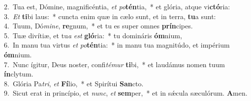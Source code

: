{2.~}Tua est, Dómine, magnificéntia, \textit{et} \textit{po}\textbf{tén}tia,~* et glória, atque vi\textbf{ctó}ria:\\
{3.~}\textit{Et} \textbf{ti}bi laus:~* cuncta enim quæ in cælo sunt, et in terra, \textbf{tu}a sunt:\\
{4.~}Tuum, Dó\textit{mi}\textit{ne}, \textbf{re}gnum,~* et tu es super omnes \textbf{prín}cipes.\\
{5.~}Tuæ divítiæ, et tu\textit{a} \textit{est} \textbf{gló}ria:~* tu domináris \textbf{óm}nium,\\
{6.~}In manu tua virtus \textit{et} \textit{po}\textbf{tén}tia:~* in manu tua magnitúdo, et impérium \textbf{óm}nium.\\
{7.~}Nunc ígitur, Deus noster, confi\textit{té}\textit{mur} \textbf{ti}bi,~* et laudámus nomen tuum \textbf{ín}clytum.\\
{8.~}Glória Pa\textit{tri}, \textit{et} \textbf{Fí}lio,~* et Spirítui \textbf{San}cto.\\
{9.~}Sicut erat in princípio, et \textit{nunc}, \textit{et} \textbf{sem}per,~* et in sǽcula sæculórum. \textbf{A}men.\\
